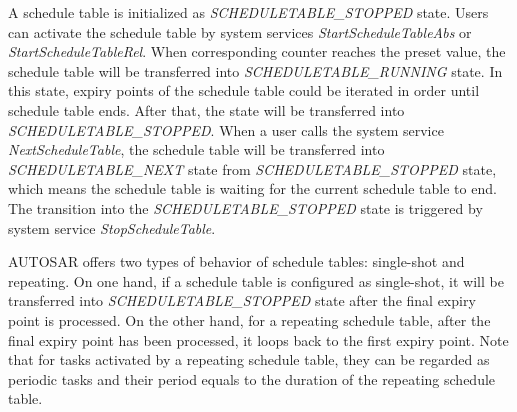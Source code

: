 \documentclass[sigconf]{acmart}
\begin{document}
A schedule table is initialized as \emph{SCHEDULETABLE\_STOPPED} state. Users can activate the schedule table by system services \emph{StartScheduleTableAbs} or \emph{StartScheduleTableRel}. When corresponding counter reaches the preset value, the schedule table will be transferred into \emph{SCHEDULETABLE\_RUNNING} state. In this state, expiry points of the schedule table could be iterated in order until schedule table ends. After that, the state will be transferred into \emph{SCHEDULETABLE\_STOPPED}. When a user calls the system service \emph{NextScheduleTable}, the schedule table will be transferred into \emph{SCHEDULETABLE\_NEXT} state from \emph{SCHEDULETABLE\_STOPPED} state, which means the schedule table is waiting for the current schedule table to end. The transition into the \emph{SCHEDULETABLE\_STOPPED} state is triggered by system service \emph{StopScheduleTable}.


AUTOSAR offers two types of behavior of schedule tables: single-shot and repeating. On one hand, if a schedule table is configured as single-shot, it will be transferred into \emph{SCHEDULETABLE\_STOPPED} state after the final expiry point is processed. On the other hand, for a repeating schedule table, after the final expiry point has been processed, it loops back to the first expiry point. Note that for tasks activated by a repeating schedule table, they can be regarded as periodic tasks and their period equals to the duration of the repeating schedule table.
\end{document}
